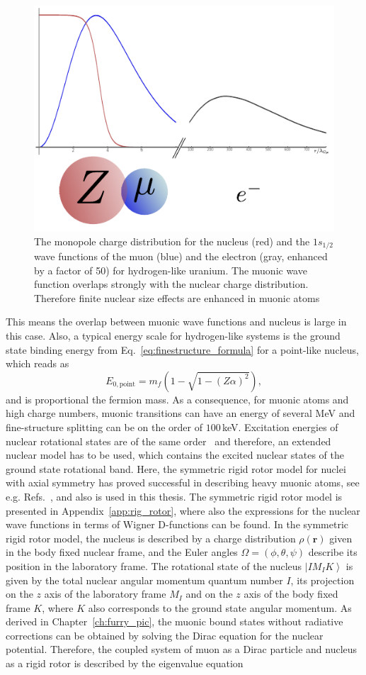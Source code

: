 %
\begin{figure}%
\centering
\includegraphics[width=0.75\linewidth]{pics/muon_groundState.pdf}%
\caption{The monopole charge distribution for the nucleus (red) and the $1s_{1/2}$ wave functions of the muon (blue) and the electron (gray, enhanced by a factor of 50) for hydrogen-like uranium. The muonic wave function overlaps strongly with the nuclear charge distribution. Therefore finite nuclear size effects are enhanced in muonic atoms}%
\label{fig:muonGS}%
\end{figure}
%
This means the overlap between muonic wave functions and nucleus is large in this case. Also, a typical energy scale for hydrogen-like systems is the ground state binding energy from Eq.~\eqref{eq:finestructure_formula} for a point-like nucleus, which reads as
\begin{equation}
E_{0,\text{point}}=m_f (1-\sqrt{1-(Z\alpha)^2}),
\end{equation}
and is proportional the fermion mass. As a consequence, for muonic atoms and high charge numbers, muonic transitions can have an energy of several MeV and fine-structure splitting can be on the order of $100\,$keV. Excitation energies of nuclear rotational states are of the same order~\cite{ENSDF} and therefore, an extended nuclear model has to be used, which contains the excited nuclear states of the ground state rotational band. Here, the symmetric rigid rotor model for nuclei with axial symmetry has proved successful in describing heavy muonic atoms, see e.g. Refs.~\cite{tanaka1984,hitlin1970,wu1969,Devons1995}, and also is used in this thesis. The symmetric rigid rotor model is presented in Appendix~\ref{app:rig_rotor}, where also the expressions for the nuclear wave functions in terms of Wigner D-functions can be found. In the symmetric rigid rotor model, the nucleus is described by a charge distribution $\rho(\mathbf{r})$ given in the body fixed nuclear frame, and the Euler angles $\Omega=(\phi,\theta,\psi)$ describe its position in the laboratory frame. The rotational state of the nucleus $\left|IM_IK\right>$ is given by the total nuclear angular momentum quantum number $I$, its projection on the $z$ axis of the laboratory frame $M_I$ and on the $z$ axis of the body fixed frame $K$, where $K$ also corresponds to the ground state angular momentum. As derived in Chapter~\ref{ch:furry_pic}, the muonic bound states without radiative corrections can be obtained by solving the Dirac equation for the nuclear potential. Therefore, the coupled system of muon as a Dirac particle and nucleus as a rigid rotor is described by the eigenvalue equation

